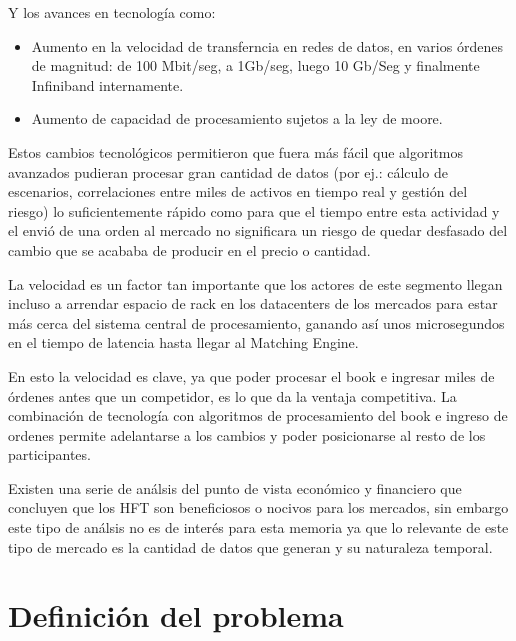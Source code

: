 Y los avances en tecnología como:
\begin{itemize}
 \item Aumento en la velocidad de transferncia en redes de datos, en varios
órdenes de magnitud: de 100 Mbit/seg, a 1Gb/seg, luego 10 Gb/Seg y finalmente
Infiniband internamente.
 \item Aumento de capacidad de procesamiento sujetos a la ley de moore.
\end{itemize}

Estos cambios tecnológicos permitieron que fuera más fácil que algoritmos
avanzados pudieran procesar gran cantidad de datos (por ej.: cálculo de
escenarios, correlaciones entre miles de activos en tiempo real y gestión del
riesgo) lo suficientemente rápido como para que el tiempo entre esta actividad
y el envió de una orden al mercado no significara un riesgo de quedar desfasado
del cambio que se acababa de producir en el precio o cantidad.

La velocidad es un factor tan importante que los actores de este segmento
llegan incluso a arrendar espacio de rack en los datacenters de los mercados
para estar más cerca del sistema central de procesamiento, ganando así unos
microsegundos en el tiempo de latencia hasta llegar al Matching Engine. 

En esto la velocidad es clave, ya que poder procesar el book e ingresar miles
de órdenes antes que un competidor, es lo que da la ventaja competitiva. La
combinación de tecnología con algoritmos de procesamiento del book e ingreso de
ordenes permite adelantarse a los cambios y poder posicionarse al resto de los
participantes. 
 
Existen una serie de análsis del punto de vista económico y financiero que
concluyen que los HFT son beneficiosos o nocivos para los mercados, sin embargo
este tipo de análsis no es de interés para esta memoria ya que lo relevante de
este tipo de mercado es la cantidad de datos que generan y su naturaleza
temporal.


\section{Definición del problema}
